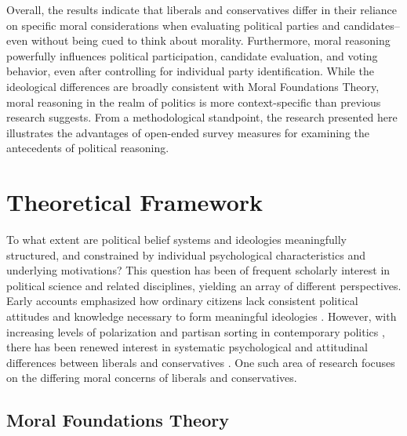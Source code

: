 \documentclass[12pt]{article}
\begin{document}
Overall, the results indicate that liberals and conservatives differ in their reliance on specific moral considerations when evaluating political parties and candidates--even without being cued to think about morality. Furthermore, moral reasoning powerfully influences political participation, candidate evaluation, and voting behavior, even after controlling for individual party identification. While the ideological differences are broadly consistent with Moral Foundations Theory, moral reasoning in the realm of politics is more context-specific than previous research suggests. From a methodological standpoint, the research presented here illustrates the advantages of open-ended survey measures for examining the antecedents of political reasoning.


\section{Theoretical Framework}

To what extent are political belief systems and ideologies meaningfully structured, and constrained by individual psychological characteristics and underlying motivations? This question has been of frequent scholarly interest in political science and related disciplines, yielding an array of different perspectives. Early accounts emphasized how ordinary citizens lack consistent political attitudes and knowledge necessary to form meaningful ideologies \citep[e.g.][]{converse1964nature}. However, with increasing levels of polarization and partisan sorting in contemporary politics \citep{iyengar2015fear}, there has been renewed interest in systematic psychological and attitudinal differences between liberals and conservatives \citep{jost2006end}. One such area of research focuses on the differing moral concerns of liberals and conservatives.


\subsection{Moral Foundations Theory}
\end{document}
